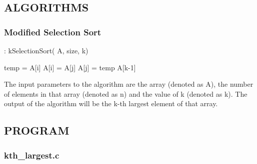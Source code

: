 	\subsection{ALGORITHMS}
	
		\subsubsection{Modified Selection Sort}

\begin{algorithm}
\caption{ : kSelectionSort( A, size, k)} %
\begin{algorithmic}[1]  %
			\STATE temp = A[i]
			\STATE A[i] = A[j]
			\STATE A[j] = temp
		\ENDIF
	\ENDFOR
\ENDFOR
\RETURN A[k-1]
\end{algorithmic}  %
\end{algorithm}

\par The input parameters to the algorithm are the array (denoted as A), the number of elements in that array (denoted as n) and the value of k (denoted as k). The output of the algorithm will be the k-th largest element of that array.


	\subsection{PROGRAM}
	
		\subsubsection{kth\_largest.c}
		
			\lstset{language=C}
			
